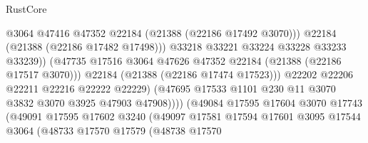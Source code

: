 \begin{lexlean}{RustCore}
\begin{coremodule}
                                            @3064
                                            @47416
                                            @47352
                                            @22184
                                            (@21388 (@22186 @17492 @3070)))
                                          @22184
                                          (@21388 (@22186 @17482 @17498)))
                                        @33218
                                        @33221
                                        @33224
                                        @33228
                                        @33233
                                        @33239))
                                    (@47735
                                      @17516
                                      @3064
                                      @47626
                                      @47352
                                      @22184
                                      (@21388 (@22186 @17517 @3070)))
                                    @22184
                                    (@21388 (@22186 @17474 @17523)))
                                  @22202
                                  @22206
                                  @22211
                                  @22216
                                  @22222
                                  @22229)
                                (@47695
                                  @17533
                                  @1101
                                  @230
                                  @11
                                  @3070
                                  @3832
                                  @3070
                                  @3925
                                  @47903
                                  @47908))))
                          (@49084
                            @17595
                            @17604
                            @3070
                            @17743
                            (@49091
                              @17595
                              @17602
                              @3240
                              (@49097
                                @17581
                                @17594
                                @17601
                                @3095
                                @17544
                                @3064
                                (@48733
                                  @17570
                                  @17579
                                  (@48738
                                    @17570

\end{coremodule}
\end{lexlean}
